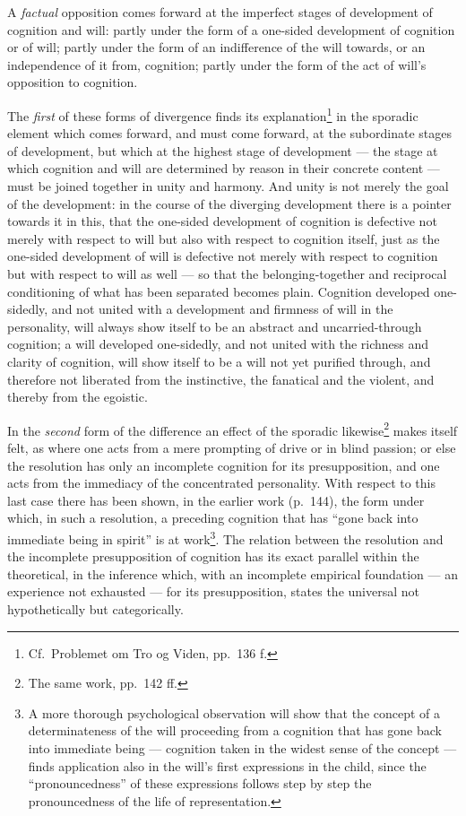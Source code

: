 \documentclass[12pt,a4paper]{book}
\begin{document}
A \emph{factual} opposition comes forward at the imperfect stages of
\setcounter{footnote}{0}%
development of cognition and will: partly under the form of a one-sided
development of cognition or of will; partly under the form of an indifference
of the will towards, or an independence of it from, cognition; partly under
the form of the act of will's opposition to cognition.

The \emph{first} of these forms of divergence finds its
explanation\footnote{Cf.\ Problemet om Tro og Viden, pp.\ 136 f.} in the
sporadic element which comes forward, and must come forward, at the
subordinate stages of development, but which at the highest stage of
development --- the stage at which cognition and will are determined by reason
in their concrete content --- must be joined together in unity and harmony.
And unity is not merely the goal of the development: in the course of the
diverging development there is a pointer towards it in this, that the
one-sided development of cognition is defective not merely with respect to
will but also with respect to cognition itself, just as the one-sided
development of will is defective not merely with respect to cognition but with
respect to will as well --- so that the belonging-together and reciprocal
conditioning of what has been separated becomes plain. Cognition developed
one-sidedly, and not united with a development and firmness of will in the
personality, will always show itself to be an abstract and uncarried-through
cognition; a will developed one-sidedly, and not united with the richness and
clarity of cognition, will show itself to be a will not yet purified through,
and therefore not liberated from the instinctive, the fanatical and the
violent, and thereby from the egoistic.

In the \emph{second} form of the difference an effect of the sporadic
likewise\footnote{The same work, pp.\ 142 ff.} makes itself felt, as where one
acts from a mere prompting of drive or in blind passion; or else the
resolution has only an incomplete cognition for its presupposition, and one
acts from the immediacy of the concentrated personality. With respect to this
last case there has been shown, in the earlier work (p.\ 144), the form
\setcounter{footnote}{0}%
under which, in such a resolution, a preceding cognition that has ``gone back
into immediate being in spirit'' is at work\footnote{A more thorough
psychological observation will show that the concept of a determinateness of
the will proceeding from a cognition that has gone back into immediate being
--- cognition taken in the widest sense of the concept --- finds application
also in the will's first expressions in the child, since the ``pronouncedness''
of these expressions follows step by step the pronouncedness of the life of
representation.}. The relation between the resolution and the incomplete
presupposition of cognition has its exact parallel within the theoretical, in
the inference which, with an incomplete empirical foundation --- an experience
not exhausted --- for its presupposition, states the universal not
hypothetically but categorically.
\end{document}
